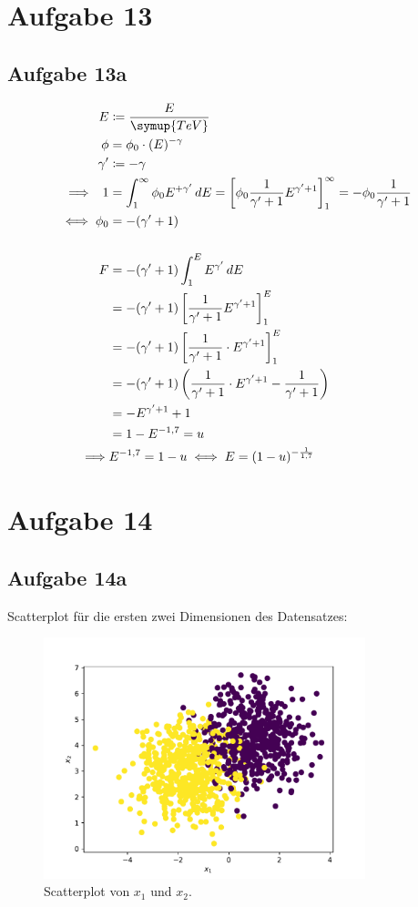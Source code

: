 



  \section{Aufgabe 13}
    \subsection{Aufgabe 13a}

    \begin{align*}
      E &\coloneq \frac{E}{\symup{TeV}}\\
      \phi &= \phi_0\cdot(E)^{-\gamma}\\
      \gamma' &\coloneq -\gamma\\
      \implies\,\,\, 1&=\int_1^\infty \phi_0E^{+\gamma'}\,dE=
      \left[\phi_0\frac1{\gamma'+1}E^{\gamma'+1}\right]_1^\infty=-\phi_0
      \frac1{\gamma'+1}\\
      \iff \phi_0&=-(\gamma'+1)\\
      \,\\
      F&=-(\gamma'+1)\int_1^E E^{\gamma'}\,dE \\
      &=-(\gamma'+1)\left[\frac1{\gamma'+1}E^{\gamma'+1}\right]_1^E\\
      &=-(\gamma'+1)\left[\frac1{\gamma'+1}\cdot E^{\gamma'+1}\right]_1^E\\
      &=-(\gamma'+1)\left(\frac1{\gamma'+1}\cdot E^{\gamma'+1}-\frac1{\gamma'+1}\right)\\
      &=-E^{\gamma'+1}+1\\
      &=1-E^{-1,7}=u\\
      \implies &E^{-1,7}=1-u \iff E=(1-u)^{-\frac1{1,7}}
    \end{align*}






  \section{Aufgabe 14}
    \subsection{Aufgabe 14a}
    Scatterplot für die ersten zwei Dimensionen des Datensatzes:
    \begin{figure}[H]
      \centering
      \includegraphics[height=7cm]{a_scatter.pdf}
      \caption{Scatterplot von $x_1$ und $x_2$.}
      \label{fig:ascatter}
    \end{figure}

